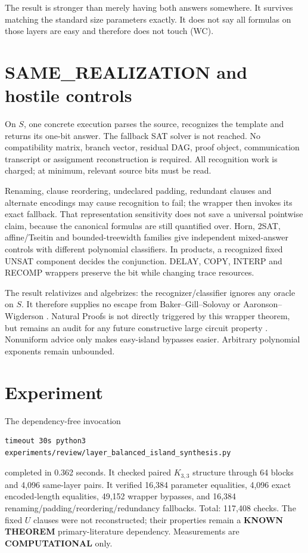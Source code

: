 \documentclass[11pt]{article}
\newcommand{\KNOWN}{\textbf{KNOWN THEOREM}}
\newcommand{\COMP}{\textbf{COMPUTATIONAL}}
\begin{document}
The result is stronger than merely having both answers somewhere.  It survives
matching the standard size parameters exactly.  It does not say all formulas
on those layers are easy and therefore does not touch (WC).

\section{SAME\_REALIZATION and hostile controls}

On $S$, one concrete execution parses the source, recognizes the template and
returns its one-bit answer.  The fallback SAT solver is not reached.  No
compatibility matrix, branch vector, residual DAG, proof object, communication
transcript or assignment reconstruction is required.  All recognition work is
charged; at minimum, relevant source bits must be read.

Renaming, clause reordering, undeclared padding, redundant clauses and alternate
encodings may cause recognition to fail; the wrapper then invokes its exact
fallback.  That representation sensitivity does not save a universal
pointwise claim, because the canonical formulas are still quantified over.
Horn, 2SAT, affine/Tseitin and bounded-treewidth families give independent
mixed-answer controls with different polynomial classifiers.  In products, a
recognized fixed UNSAT component decides the conjunction.  DELAY, COPY,
INTERP and RECOMP wrappers preserve the bit while changing trace resources.

The result relativizes and algebrizes: the recognizer/classifier ignores any
oracle on $S$.  It therefore supplies no escape from Baker--Gill--Solovay or
Aaronson--Wigderson \cite{bgs,aw}.  Natural Proofs is not directly triggered
by this wrapper theorem, but remains an audit for any future constructive large
circuit property \cite{rr}.  Nonuniform advice only makes easy-island bypasses
easier.  Arbitrary polynomial exponents remain unbounded.

\section{Experiment}

The dependency-free invocation
\begin{verbatim}
timeout 30s python3 experiments/review/layer_balanced_island_synthesis.py
\end{verbatim}
completed in 0.362 seconds.  It checked paired $K_{3,3}$ structure through 64
blocks and 4,096 same-layer pairs.  It verified 16,384 parameter equalities,
4,096 exact encoded-length equalities, 49,152 wrapper bypasses, and 16,384
renaming/padding/reordering/redundancy fallbacks.  Total: 117,408 checks.
The fixed $U$ clauses were not reconstructed; their properties remain a
\KNOWN{} primary-literature dependency.  Measurements are \COMP{} only.
\end{document}
